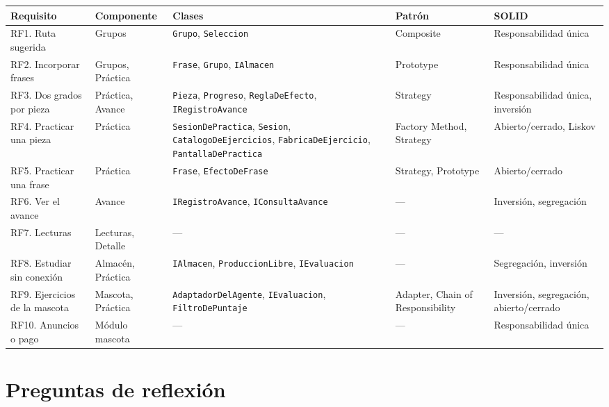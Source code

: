 \documentclass[11pt]{article}
\begin{document}
\begin{center}
\scriptsize
\setlength{\tabcolsep}{3pt}
\renewcommand{\arraystretch}{1.25}
\begin{tabular}{@{}>{\raggedright\arraybackslash}p{1.7cm}>{\raggedright\arraybackslash}p{2.2cm}>{\raggedright\arraybackslash}p{4.4cm}>{\raggedright\arraybackslash}p{2.7cm}>{\raggedright\arraybackslash}p{2.7cm}@{}}
\hline
Requisito & Componente & Clases & Patrón & SOLID \\
\hline
RF1. Ruta sugerida & Grupos & \texttt{Grupo}, \texttt{Seleccion} & Composite & Responsabilidad única \\
RF2. Incorporar frases & Grupos, Práctica & \texttt{Frase}, \texttt{Grupo}, \texttt{IAlmacen} & Prototype & Responsabilidad única \\
RF3. Dos grados por pieza & Práctica, Avance & \texttt{Pieza}, \texttt{Progreso}, \texttt{ReglaDeEfecto}, \texttt{IRegistroAvance} & Strategy & Responsabilidad única, inversión \\
RF4. Practicar una pieza & Práctica & \texttt{SesionDePractica}, \texttt{Sesion}, \texttt{CatalogoDeEjercicios}, \texttt{FabricaDeEjercicio}, \texttt{PantallaDePractica} & Factory Method, Strategy & Abierto/cerrado, Liskov \\
RF5. Practicar una frase & Práctica & \texttt{Frase}, \texttt{EfectoDeFrase} & Strategy, Prototype & Abierto/cerrado \\
RF6. Ver el avance & Avance & \texttt{IRegistroAvance}, \texttt{IConsultaAvance} & --- & Inversión, segregación \\
RF7. Lecturas & Lecturas, Detalle & --- & --- & --- \\
RF8. Estudiar sin conexión & Almacén, Práctica & \texttt{IAlmacen}, \texttt{ProduccionLibre}, \texttt{IEvaluacion} & --- & Segregación, inversión \\
RF9. Ejercicios de la mascota & Mascota, Práctica & \texttt{AdaptadorDelAgente}, \texttt{IEvaluacion}, \texttt{FiltroDePuntaje} & Adapter, Chain of Responsibility & Inversión, segregación, abierto/cerrado \\
RF10. Anuncios o pago & Módulo mascota & --- & --- & Responsabilidad única \\
\hline
\end{tabular}
\end{center}

\section{Preguntas de reflexión}
\end{document}
